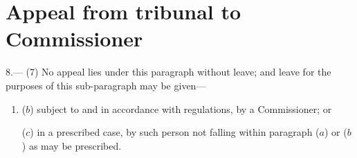 \documentclass[12pt,a4paper]{article}
\begin{document}
\section*{Appeal from tribunal to Commissioner}

8.---%
%
%
%
%
%
%
%
%
%
%
(7) No appeal lies under this paragraph without leave; and leave for the purposes of this sub-paragraph may be given—
\begin{enumerate}\item[]

($b$) subject to and in accordance with regulations, by a Commissioner; or

($c$) in a prescribed case, by such person not falling within paragraph ($a$)  or ($b$)  as may be prescribed.
\end{enumerate}
\end{document}
